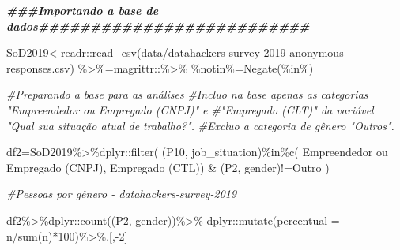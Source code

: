 \documentclass[
]{article}
\newenvironment{Shaded}{\begin{snugshade}}{\end{snugshade}}
\newcommand{\AttributeTok}[1]{\textcolor[rgb]{0.77,0.63,0.00}{#1}}
\newcommand{\CommentTok}[1]{\textcolor[rgb]{0.56,0.35,0.01}{\textit{#1}}}
\newcommand{\DecValTok}[1]{\textcolor[rgb]{0.00,0.00,0.81}{#1}}
\newcommand{\DocumentationTok}[1]{\textcolor[rgb]{0.56,0.35,0.01}{\textbf{\textit{#1}}}}
\newcommand{\FunctionTok}[1]{\textcolor[rgb]{0.00,0.00,0.00}{#1}}
\newcommand{\NormalTok}[1]{#1}
\newcommand{\OtherTok}[1]{\textcolor[rgb]{0.56,0.35,0.01}{#1}}
\newcommand{\SpecialCharTok}[1]{\textcolor[rgb]{0.00,0.00,0.00}{#1}}
\newcommand{\StringTok}[1]{\textcolor[rgb]{0.31,0.60,0.02}{#1}}
\begin{document}
\begin{Shaded}
\begin{Highlighting}[]
\DocumentationTok{\#\#\#Importando a base de dados\#\#\#\#\#\#\#\#\#\#\#\#\#\#\#\#\#\#\#\#\#\#\#\#\#\#}

\NormalTok{SoD2019}\OtherTok{\textless{}{-}}\NormalTok{readr}\SpecialCharTok{::}\FunctionTok{read\_csv}\NormalTok{(}\StringTok{\textquotesingle{}data/datahackers{-}survey{-}2019{-}anonymous{-}responses.csv\textquotesingle{}}\NormalTok{)}
\StringTok{\textasciigrave{}}\AttributeTok{\%\textgreater{}\%}\StringTok{\textasciigrave{}}\OtherTok{=}\NormalTok{magrittr}\SpecialCharTok{::}\StringTok{\textasciigrave{}}\AttributeTok{\%\textgreater{}\%}\StringTok{\textasciigrave{}}
\StringTok{\textasciigrave{}}\AttributeTok{\%notin\%}\StringTok{\textasciigrave{}}\OtherTok{=}\FunctionTok{Negate}\NormalTok{(}\StringTok{\textasciigrave{}}\AttributeTok{\%in\%}\StringTok{\textasciigrave{}}\NormalTok{)}

\CommentTok{\#Preparando a base para as análises}
\CommentTok{\#Incluo na base apenas as categorias "Empreendedor ou Empregado (CNPJ)" e}
\CommentTok{\#"Empregado (CLT)" da variável "Qual sua situação atual de trabalho?".}
\CommentTok{\#Excluo a categoria de gênero "Outros".}

\NormalTok{df2}\OtherTok{=}\NormalTok{SoD2019}\SpecialCharTok{\%\textgreater{}\%}\NormalTok{dplyr}\SpecialCharTok{::}\FunctionTok{filter}\NormalTok{(}
  \StringTok{\textasciigrave{}}\AttributeTok{(\textquotesingle{}P10\textquotesingle{}, \textquotesingle{}job\_situation\textquotesingle{})}\StringTok{\textasciigrave{}}\SpecialCharTok{\%in\%}\FunctionTok{c}\NormalTok{(}
    \StringTok{\textquotesingle{}Empreendedor ou Empregado (CNPJ)\textquotesingle{}}\NormalTok{, }\StringTok{\textquotesingle{}Empregado (CTL)\textquotesingle{}}\NormalTok{) }\SpecialCharTok{\&}
    \StringTok{\textasciigrave{}}\AttributeTok{(\textquotesingle{}P2\textquotesingle{}, \textquotesingle{}gender\textquotesingle{})}\StringTok{\textasciigrave{}}\SpecialCharTok{!=}\StringTok{\textquotesingle{}Outro\textquotesingle{}}\NormalTok{ )}

\CommentTok{\#Pessoas por gênero {-} datahackers{-}survey{-}2019}

\NormalTok{df2}\SpecialCharTok{\%\textgreater{}\%}\NormalTok{dplyr}\SpecialCharTok{::}\FunctionTok{count}\NormalTok{(}\StringTok{\textasciigrave{}}\AttributeTok{(\textquotesingle{}P2\textquotesingle{}, \textquotesingle{}gender\textquotesingle{})}\StringTok{\textasciigrave{}}\NormalTok{)}\SpecialCharTok{\%\textgreater{}\%}
\NormalTok{  dplyr}\SpecialCharTok{::}\FunctionTok{mutate}\NormalTok{(}\AttributeTok{percentual =}\NormalTok{ n}\SpecialCharTok{/}\FunctionTok{sum}\NormalTok{(n)}\SpecialCharTok{*}\DecValTok{100}\NormalTok{)}\SpecialCharTok{\%\textgreater{}\%}\NormalTok{.[,}\SpecialCharTok{{-}}\DecValTok{2}\NormalTok{]}
\end{Highlighting}
\end{Shaded}
\end{document}

